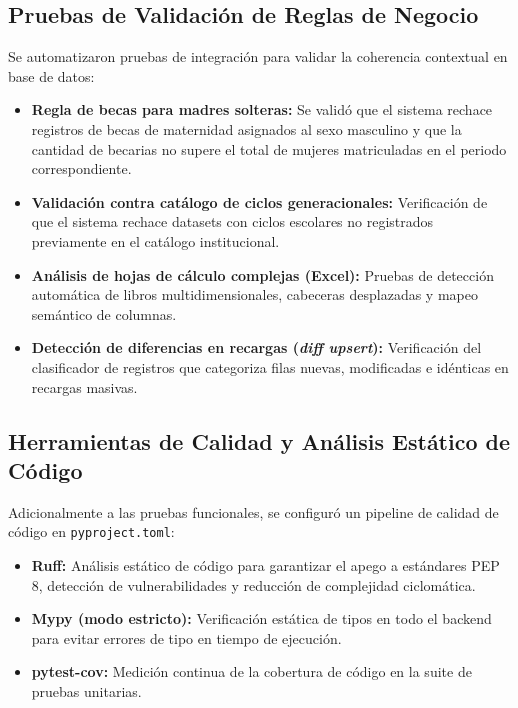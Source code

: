\subsection{Pruebas de Validación de Reglas de Negocio}

Se automatizaron pruebas de integración para validar la coherencia contextual en base de datos:

\begin{itemize}
    \item \textbf{Regla de becas para madres solteras:} Se validó que el sistema rechace registros de becas de maternidad asignados al sexo masculino y que la cantidad de becarias no supere el total de mujeres matriculadas en el periodo correspondiente.
    \item \textbf{Validación contra catálogo de ciclos generacionales:} Verificación de que el sistema rechace datasets con ciclos escolares no registrados previamente en el catálogo institucional.
    \item \textbf{Análisis de hojas de cálculo complejas (Excel):} Pruebas de detección automática de libros multidimensionales, cabeceras desplazadas y mapeo semántico de columnas.
    \item \textbf{Detección de diferencias en recargas (\textit{diff upsert}):} Verificación del clasificador de registros que categoriza filas nuevas, modificadas e idénticas en recargas masivas.
\end{itemize}

\subsection{Herramientas de Calidad y Análisis Estático de Código}

Adicionalmente a las pruebas funcionales, se configuró un pipeline de calidad de código en \texttt{pyproject.toml}:

\begin{itemize}
    \item \textbf{Ruff:} Análisis estático de código para garantizar el apego a estándares PEP 8, detección de vulnerabilidades y reducción de complejidad ciclomática.
    \item \textbf{Mypy (modo estricto):} Verificación estática de tipos en todo el backend para evitar errores de tipo en tiempo de ejecución.
    \item \textbf{pytest-cov:} Medición continua de la cobertura de código en la suite de pruebas unitarias.
\end{itemize}

